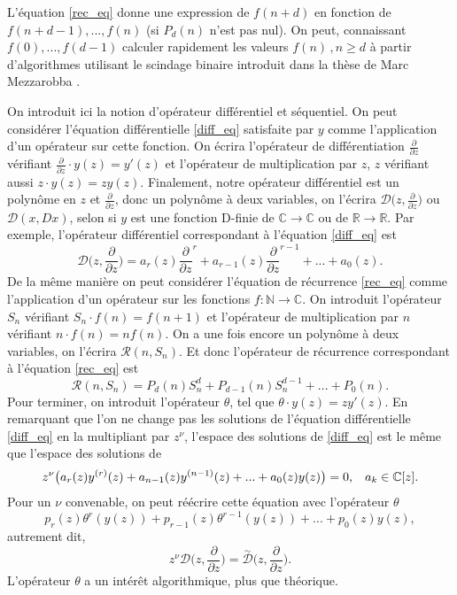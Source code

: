 \documentclass[a4paper,10pt]{article}
\begin{document}
	L'équation \eqref{rec_eq} donne une expression de $f(n+d)$ en fonction de $f(n+d-1), ...,f(n)$ (si $P_d(n)$ n'est pas nul). On peut, connaissant $f(0),...,f(d-1)$ calculer rapidement les valeurs $f(n) \, , n \geq d$  à partir d'algorithmes utilisant le scindage binaire introduit dans la thèse de Marc Mezzarobba \cite[chap.6]{Mezzarobba2011}.
	
	\vspace{7mm}
	
	On introduit ici la notion d'opérateur différentiel et séquentiel. On peut considérer l'équation différentielle \eqref{diff_eq} satisfaite par $y$ comme l'application d'un opérateur sur cette fonction. On écrira l'opérateur de différentiation $\frac{\partial}{\partial z}$ vérifiant $\frac{\partial}{\partial z}\cdot y(z)=y'(z)$ et l'opérateur de multiplication par $z$, $z$ vérifiant aussi $z \cdot y(z)=zy(z)$. Finalement, notre opérateur différentiel est un polynôme en $z$ et $\frac{\partial}{\partial z}$, donc un polynôme à deux variables, on l'écrira $\mathcal{D}\big(z,\frac{\partial}{\partial z}\big)$ ou $\mathcal{D}(x,Dx)$, selon si $y$ est une fonction D-finie de $\mathbb{C} \rightarrow\mathbb{C}$ ou de $\mathbb{R}\rightarrow\mathbb{R}$. Par exemple, l'opérateur différentiel correspondant à l'équation \eqref{diff_eq} est
	\[\mathcal{D}\Big(z,\frac{\partial}{\partial z}\Big)=a_r(z)\frac{\partial}{\partial z}^r+a_{r-1}(z)\frac{\partial}{\partial z}^{r-1}+...+a_0(z).\]
	De la même manière on peut considérer l'équation de récurrence \eqref{rec_eq} comme l'application d'un opérateur sur les fonctions $f:\mathbb{N}\rightarrow \mathbb{C}$. On introduit l'opérateur $S_n$ vérifiant $S_n\cdot f(n)=f(n+1)$ et l'opérateur de multiplication par $n$ vérifiant $n \cdot f(n)=nf(n)$. On a une fois encore un polynôme à deux variables, on l'écrira $\mathcal{R}(n,S_n)$. Et donc l'opérateur de récurrence correspondant à l'équation \eqref{rec_eq} est 
	\[\mathcal{R}(n,S_n)=P_d(n)S_n^d+P_{d-1}(n)S_n^{d-1}+...+P_0(n).\]
	Pour terminer, on introduit l'opérateur $\theta$, tel que $\theta \cdot y(z)= z y'(z)$. En remarquant que l'on ne change pas les solutions de l'équation différentielle \eqref{diff_eq} en la multipliant par $z^{\nu}$, l'espace des solutions de \eqref{diff_eq} est le même que l'espace des solutions de
	\[z^{\nu}\big(a_{r}(z)y^{(r)}(z)+a_{n-1}(z)y^{(n-1)}(z)+...+a_{0}(z)y(z)\big)=0, \hspace{3mm} a_{k}\in \mathbb{C}[z].\]
	Pour un $\nu$ convenable, on peut réécrire cette équation avec l'opérateur $\theta$
	\[p_r(z)\theta^r(y(z))+p_{r-1}(z)\theta^{r-1}(y(z))+...+p_0(z)y(z),\]
	autrement dit,
	\[z^{\nu}\mathcal{D}\big(z,\frac{\partial}{\partial z}\big)=\overset{\sim}{\mathcal{D}}\big(z,\frac{\partial}{\partial z}\big).\]
	L'opérateur $\theta$ a un intérêt algorithmique, plus que théorique. 
	
\end{document}
